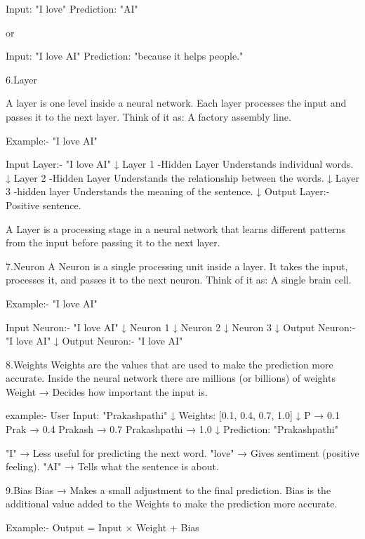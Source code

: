 Input: "I love"
Prediction: "AI"

or

Input: "I love AI"
Prediction: "because it helps people."






6.Layer

A layer is one level inside a neural network. Each layer processes the input and passes it to the next layer.
Think of it as: A factory assembly line.

Example:-
"I love AI"

Input Layer:- 
"I love AI"
 ↓
Layer 1 -Hidden Layer
Understands individual words.
  ↓
Layer 2 -Hidden Layer
Understands the relationship between the words.
  ↓
Layer 3 -hidden layer
Understands the meaning of the sentence.
  ↓
Output Layer:- Positive sentence.

A Layer is a processing stage in a neural network that learns different patterns from the input before passing it to the next layer.






7.Neuron
 A Neuron is a single processing unit inside a layer. It takes the input, processes it, and passes it to the next neuron.
 Think of it as: A single brain cell.

 Example:-
 "I love AI"

 Input Neuron:-
 "I love AI"
 ↓
 Neuron 1
 ↓
 Neuron 2
 ↓
 Neuron 3
 ↓
 Output Neuron:-
 "I love AI"
 ↓
 Output Neuron:-
 "I love AI"




8.Weights 
Weights are the values that are used to make the prediction more accurate.
Inside the neural network there are millions (or billions) of weights 
Weight → Decides how important the input is.

example:-
User Input: "Prakashpathi"
  ↓
Weights:
[0.1, 0.4, 0.7, 1.0]
  ↓
P              → 0.1
Prak           → 0.4
Prakash        → 0.7
Prakashpathi   → 1.0
 ↓
 Prediction: "Prakashpathi"

 "I"    → Less useful for predicting the next word.
 "love" → Gives sentiment (positive feeling).
 "AI"   → Tells what the sentence is about.




9.Bias
Bias → Makes a small adjustment to the final prediction.
Bias is the additional value added to the Weights to make the prediction more accurate.

Example:-
Output = Input × Weight + Bias

